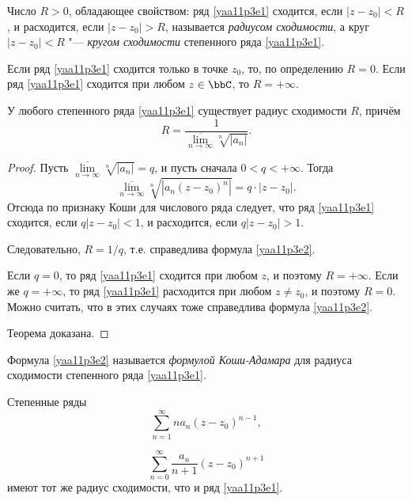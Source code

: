 \begin{defn}
Число $R>0$, обладающее свойством: ряд \eqref{yaa11p3e1} сходится, если $|z-z_0|<R$, и расходится, если $|z-z_0|>R$, называется \textit{радиусом сходимости}, а круг $|z-z_0|<R$ "--- \textit{кругом сходимости} степенного ряда \eqref{yaa11p3e1}.

Если ряд \eqref{yaa11p3e1} сходится только в точке $z_0$, то, по определению $R=0$. Если ряд \eqref{yaa11p3e1} сходится при любом $z\in\bbC$, то $R=+\infty$.
\end{defn}

\begin{thm}
У любого степенного ряда \eqref{yaa11p3e1} существует радиус сходимости $R$, причём
\begin{equation}\label{yaa11p3e2}
R=\frac{1}{\overline{\lim\limits_{n\to\infty}}\sqrt[n]{|a_n|}}.
\end{equation} 
\end{thm}

\begin{proof}
Пусть $\overline{\lim\limits_{n\to\infty}}\sqrt[n]{|a_n|}=q$, и пусть сначала $0<q<+\infty$. Тогда
$$
\overline{\lim\limits_{n\to\infty}}\sqrt[n]{|a_n(z-z_0)^n|}=q\cdot |z-z_0|.
$$
Отсюда по признаку Коши для числового ряда следует, что ряд \eqref{yaa11p3e1} сходится, если $q|z-z_0|<1$, и расходится, если $q|z-z_0|>1$.

Следовательно, $R=1/q$, т.е. справедлива формула \eqref{yaa11p3e2}.

Если $q=0$, то ряд \eqref{yaa11p3e1} сходится при любом $z$, и поэтому $R=+\infty$. Если же $q=+\infty$, то ряд \eqref{yaa11p3e1} расходится при любом $z\ne z_0$, и поэтому $R=0$. Можно считать, что в этих случаях тоже справедлива формула \eqref{yaa11p3e2}. 

Теорема доказана.
\end{proof}

Формула \eqref{yaa11p3e2} называется \textit{формулой Коши-Адамара} для радиуса сходимости степенного ряда \eqref{yaa11p3e1}.

\begin{thm} \label{yaa11p3thm3}
Степенные ряды
\begin{equation}\label{yaa11p3e5}
\sum\limits_{n=1}^{\infty} na_n(z-z_0)^{n-1},
\end{equation}

\begin{equation}\label{yaa11p3e6}
\sum\limits_{n=0}^{\infty}\frac{a_n}{n+1}(z-z_0)^{n+1}
\end{equation}
имеют тот же радиус сходимости, что и ряд \eqref{yaa11p3e1}.
\end{thm}

